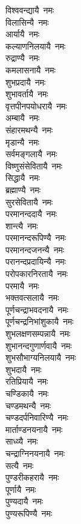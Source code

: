 \begin{multicols}{2}
\begin{flushleft}
विश्ववन्द्यायै~नमः\\
विलासिन्यै~नमः\\
आर्यायै~नमः\\
कल्याणनिलयायै~नमः\\
रुद्राण्यै~नमः\\
कमलासनायै~नमः\\
शुभप्रदायै~नमः\\
शुभावर्तायै~नमः\\
वृत्तपीनपयोधरायै~नमः\hfill{}\\
अम्बायै~नमः\\
संहारमथन्यै~नमः\\
मृडान्यै~नमः\\
सर्वमङ्गलायै~नमः\\
विष्णुसंसेवितायै~नमः\\
सिद्धायै~नमः\\
ब्रह्माण्यै~नमः\\
सुरसेवितायै~नमः\\
परमानन्ददायै~नमः\\
शान्त्यै~नमः\hfill{}\\
परमानन्दरूपिण्यै~नमः\\
परमानन्दजनन्यै~नमः\\
परानन्दप्रदायिन्यै~नमः\\
परोपकारनिरतायै~नमः\\
परमायै~नमः\\
भक्तवत्सलायै~नमः\\
पूर्णचन्द्राभवदनायै~नमः\\
पूर्णचन्द्रनिभांशुकायै~नमः\\
शुभलक्षणसम्पन्नायै~नमः\\
शुभानन्दगुणार्णवायै~नमः\hfill{}\\
शुभसौभाग्यनिलयायै~नमः\\
शुभदायै~नमः\\
रतिप्रियायै~नमः\\
चण्डिकायै~नमः\\
चण्डमथन्यै~नमः\\
चण्डदर्पनिवारिण्यै~नमः\\
मार्ताण्डनयनायै~नमः\\
साध्व्यै~नमः\\
चन्द्राग्निनयनायै~नमः\\
सत्यै~नमः\hfill{}\\
पुण्डरीकहरायै~नमः\\
पूर्णायै~नमः\\
पुण्यदायै~नमः\\
पुण्यरूपिण्यै~नमः\\

\end{flushleft}
\end{multicols}
